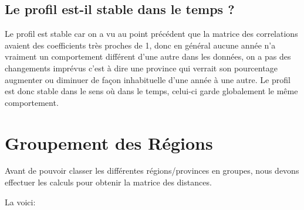 \documentclass{article}
\begin{document}
 \newpage
\subsection{Le profil est-il stable dans le temps ?}

Le profil est stable car on a vu au point précédent que la matrice des correlations avaient des coefficients très proches de 1, donc en général aucune année n'a vraiment un comportement différent d'une autre dans les données, on a pas des changements imprévus c'est à dire une province qui verrait son pourcentage augmenter ou diminuer de façon inhabituelle d'une année à une autre. Le profil est donc stable dans le sens où dans le temps, celui-ci garde globalement le même comportement. 

\section{Groupement des Régions}
Avant de pouvoir classer les différentes régions/provinces en groupes, nous devons effectuer les calculs pour obtenir la matrice des distances.

La voici:
\end{document}
